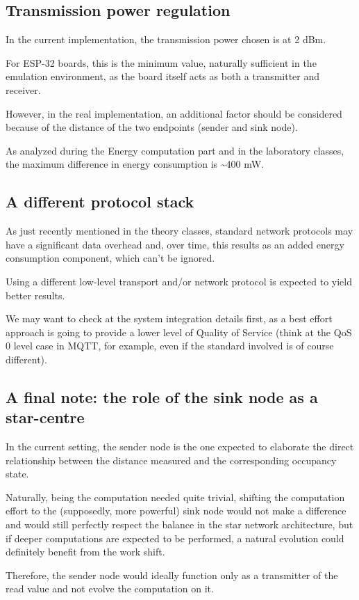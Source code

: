 \documentclass[a4paper,11pt]{article} %
\begin{document}
    \subsection{Transmission power regulation}\label{subsec:transmission-power-regulation}
    In the current implementation, the transmission power chosen is at 2 dBm.

    For ESP-32 boards, this is the minimum value, naturally sufficient in the emulation environment, as the board itself acts as both a transmitter and receiver.

    However, in the real implementation, an additional factor should be considered because of the distance of the two endpoints (sender and sink node).

    As analyzed during the Energy computation part and in the laboratory classes, the maximum difference in energy consumption is \sim 400 mW\@.

    \subsection{A different protocol stack}\label{subsec:a-different-protocol-stack}

    As just recently mentioned in the theory classes, standard network protocols may have a significant data overhead and, over time, this results as an added energy consumption component, which can't be ignored.

    Using a different low-level transport and/or network protocol is expected to yield better results.

    We may want to check at the system integration details first, as a best effort approach is going to provide a lower level of Quality of Service (think at the QoS 0 level case in MQTT, for example, even if the standard involved is of course different).

    \subsection{A final note: the role of the sink node as a star-centre}\label{subsec:a-final-note:-the-role-of-the-sink-node-as-a-star-centre}

    In the current setting, the sender node is the one expected to elaborate the direct relationship between the distance measured and the corresponding occupancy state.

    Naturally, being the computation needed quite trivial, shifting the computation effort to the (supposedly, more powerful) sink node would not make a difference and would still perfectly respect the balance
    in the star network architecture, but if deeper computations are expected to be performed, a natural evolution could definitely benefit from the work shift.

    Therefore, the sender node would ideally function only as a transmitter of the read value and not evolve the computation on it.
\end{document}
